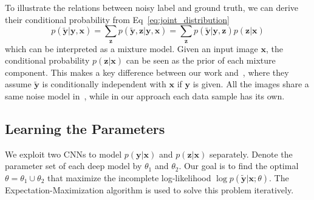 \documentclass[10pt,twocolumn,letterpaper]{article}
\def\vec{\mathbf}
\begin{document}
To illustrate the relations between noisy label and ground truth, we can derive their conditional probability from Eq~\ref{eq:joint_distribution}
\begin{equation}
    p(\tilde{\vec{y}} | \vec{y}, \vec{x}) = \sum_{\vec{z}} p(\tilde{\vec{y}}, \vec{z} | \vec{y}, \vec{x}) = \sum_{\vec{z}} p(\tilde{\vec{y}} | \vec{y}, \vec{z}) p(\vec{z} | \vec{x})
\end{equation}
which can be interpreted as a mixture model. Given an input image $\vec{x}$, the conditional probability $p(\vec{z} | \vec{x})$ can be seen as the prior of each mixture component. This makes a key difference between our work and~\cite{sukhbaatar2014learning}, where they assume $\tilde{\vec{y}}$ is conditionally independent with $\vec{x}$ if $\vec{y}$ is given. All the images share a same noise model in~\cite{sukhbaatar2014learning}, while in our approach each data sample has its own.

\subsection{Learning the Parameters} %
\label{sub:learning_the_parameters}
We exploit two CNNs to model $p(\vec{y} | \vec{x})$ and $p(\vec{z} | \vec{x})$ separately. Denote the parameter set of each deep model by $\theta_1$ and $\theta_2$. Our goal is to find the optimal $\theta = \theta_1 \cup \theta_2$ that maximize the incomplete log-likelihood $\log p(\tilde{\vec{y}} | \vec{x}; \theta)$. The Expectation-Maximization algorithm is used to solve this problem iteratively.
\end{document}
